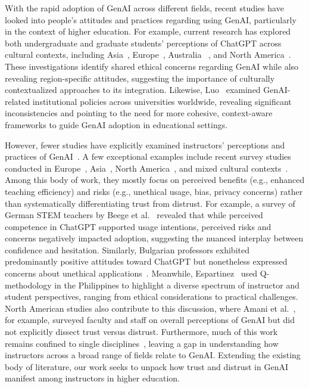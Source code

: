 With the rapid adoption of GenAI across different fields, recent studies have looked into people's attitudes and practices regarding using GenAI, particularly in the context of higher education.  For example, current research has explored both undergraduate and graduate students' perceptions of ChatGPT across cultural contexts, including Asia~\cite{ngo2023perception, farhi2023analyzing, shoufan2023exploring}, Europe~\cite{stohr2024perceptions, singh2023exploring, romero2023use}, Australia ~\cite{gruenhagen2024rapid}, and North America~\cite{baek2024chatgpt}. These investigations identify shared ethical concerns regarding GenAI while also revealing region-specific attitudes, suggesting the importance of culturally contextualized approaches to its integration. Likewise, Luo~\cite{luo2024critical} examined GenAI-related institutional policies across universities worldwide, revealing significant inconsistencies and pointing to the need for more cohesive, context-aware frameworks to guide GenAI adoption in educational settings. 

However, fewer studies have explicitly examined instructors' perceptions and practices of GenAI~\cite{albayati2024investigating}. A few exceptional examples include recent survey studies conducted in Europe~\cite{beege2024ai,kiryakova2023chatgpt}, Asia~\cite{espartinez2024exploring}, North America~\cite{amani2023generative, ghimire2024generative}, and mixed cultural contexts~\cite{lau2023ban}. Among this body of work, they mostly focus on perceived benefits (e.g., enhanced teaching efficiency) and risks (e.g., unethical usage, bias, privacy concerns) rather than systematically differentiating trust from distrust. For example, a survey of German STEM teachers by Beege et al.~\cite{beege2024ai} revealed that while perceived competence in ChatGPT supported usage intentions, perceived risks and concerns negatively impacted adoption, suggesting the nuanced interplay between confidence and hesitation. Similarly, Bulgarian professors exhibited predominantly positive attitudes toward ChatGPT but nonetheless expressed concerns about unethical applications~\cite{kiryakova2023chatgpt}. Meanwhile, Espartinez~\cite{espartinez2024exploring} used Q-methodology in the Philippines to highlight a diverse spectrum of instructor and student perspectives, ranging from ethical considerations to practical challenges. North American studies also contribute to this discussion, where Amani et al.~\cite{amani2023generative}, for example, surveyed faculty and staff on overall perceptions of GenAI but did not explicitly dissect trust versus distrust. Furthermore, much of this work remains confined to single disciplines~\cite{ayanwale2024exploring, lau2023ban}, leaving a gap in understanding how instructors across a broad range of fields relate to GenAI. Extending the existing body of literature, our work seeks to unpack how trust and distrust in GenAI manifest among instructors in higher education.


